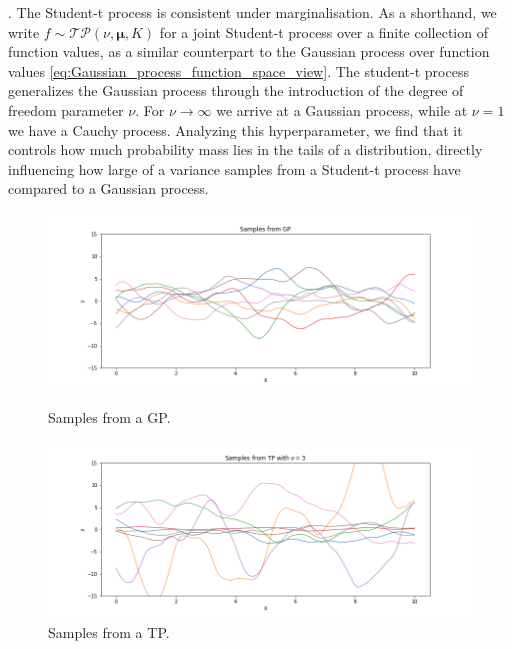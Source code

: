\cite{Shah_14}. The Student-t process is consistent under marginalisation. As a shorthand, we write $f \sim \mathcal{TP}(\nu, \bm{\mu},K)$ for a joint Student-t process over a finite collection of function values, as a similar counterpart to the Gaussian process over function values \ref{eq:Gaussian_process_function_space_view}. The student-t process generalizes the Gaussian process through the introduction of the degree of freedom parameter $\nu$. For  $\nu \to \infty$ we arrive at a Gaussian process, while at $\nu = 1$ we have a Cauchy process. Analyzing this hyperparameter, we find that it controls how much probability mass lies in the tails of a distribution, directly influencing how large of a variance samples from a Student-t process have compared to a Gaussian process.
\begin{figure}[h!]%
	\centering
	\begin{minipage}{0.75\textwidth}
		\centering
		\includegraphics[scale=0.4]{img/05_8/GP_samples.png} %
		\caption[GP samples example]{Samples from a GP.}
		\label{fig:GP_samples}
	\end{minipage}\hfill
	\begin{minipage}{0.75\textwidth}
		\centering
		\includegraphics[scale=0.4]{img/05_8/TP_samples.png} %
		\caption[TP samples example]{Samples from a TP.}
		\label{fig:TP_samples}
	\end{minipage}
\end{figure}
